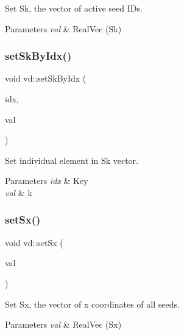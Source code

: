 Set Sk, the vector of active seed I\+Ds. 


\begin{DoxyParams}{Parameters}
{\em val} & Real\+Vec (Sk) \\
\hline
\end{DoxyParams}
\mbox{\label{classvd_a578ca6980896563397214c584401c7f5}} 
\subsubsection{\texorpdfstring{set\+Sk\+By\+Idx()}{setSkByIdx()}}
{\footnotesize\ttfamily void vd\+::set\+Sk\+By\+Idx (\begin{DoxyParamCaption}\item[{\mbox{\hyperlink{typedefs_8h_a8ad23e2333787a214e20a58a284a5a60}{uint32}}}]{idx,  }\item[{\mbox{\hyperlink{typedefs_8h_a58a0c7cf2501f4492da833421be92547}{real}}}]{val }\end{DoxyParamCaption})}



Set individual element in Sk vector. 


\begin{DoxyParams}{Parameters}
{\em idx} & Key \\
\hline
{\em val} & k \\
\hline
\end{DoxyParams}
\mbox{\label{classvd_af83b298bdb5fcc3dd0b87bb8ed68e4a1}} 
\subsubsection{\texorpdfstring{set\+Sx()}{setSx()}}
{\footnotesize\ttfamily void vd\+::set\+Sx (\begin{DoxyParamCaption}\item[{\mbox{\hyperlink{typedefs_8h_a84b6d9a0fbb45e01ad4a3aa5667f2992}{Real\+Vec}}}]{val }\end{DoxyParamCaption})}



Set Sx, the vector of x coordinates of all seeds. 


\begin{DoxyParams}{Parameters}
{\em val} & Real\+Vec (Sx) \\
\hline
\end{DoxyParams}
\mbox{\label{classvd_a440d47d94f489ceefa9037be51daef66}} 
